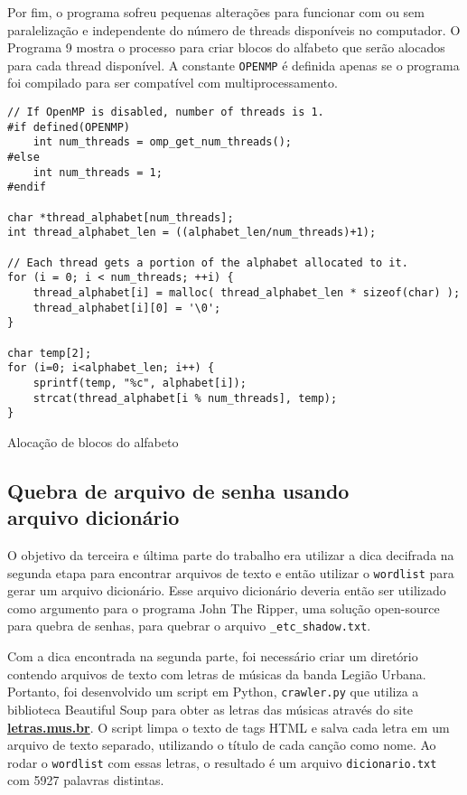 \documentclass{sig-alternate-05-2015}
\begin{document}
Por fim, o programa sofreu pequenas alterações para funcionar com ou sem paralelização e independente do número de threads disponíveis no computador.
O Programa 9 mostra o processo para criar blocos do alfabeto que serão alocados para cada thread disponível.
A constante \texttt{OPENMP} é definida apenas se o programa foi compilado para ser compatível com multiprocessamento.

\begin{program}
\begin{lstlisting}
// If OpenMP is disabled, number of threads is 1.
#if defined(OPENMP)
    int num_threads = omp_get_num_threads();
#else
    int num_threads = 1;
#endif

char *thread_alphabet[num_threads];
int thread_alphabet_len = ((alphabet_len/num_threads)+1);

// Each thread gets a portion of the alphabet allocated to it. 
for (i = 0; i < num_threads; ++i) {
    thread_alphabet[i] = malloc( thread_alphabet_len * sizeof(char) );
    thread_alphabet[i][0] = '\0';
}

char temp[2];
for (i=0; i<alphabet_len; i++) {
    sprintf(temp, "%c", alphabet[i]);
    strcat(thread_alphabet[i % num_threads], temp);
}\end{lstlisting}
\caption{Alocação de blocos do alfabeto}
\end{program}

\subsection{Quebra de arquivo de senha usando\\ arquivo dicionário}

O objetivo da terceira e última parte do trabalho era utilizar a dica decifrada na segunda etapa para encontrar arquivos de texto e então utilizar o \texttt{wordlist} para gerar um arquivo dicionário.
Esse arquivo dicionário deveria então ser utilizado como argumento para o programa John The Ripper, uma solução open-source para quebra de senhas, para quebrar o arquivo \texttt{\_etc\_shadow.txt}.

Com a dica encontrada na segunda parte, foi necessário criar um diretório contendo arquivos de texto com letras de músicas da banda Legião Urbana.
Portanto, foi desenvolvido um script em Python, \texttt{crawler.py} que utiliza a biblioteca Beautiful Soup \cite{beautifulsoup} para obter as letras das músicas através do site \textbf{\url{letras.mus.br}}.
O script limpa o texto de tags HTML e salva cada letra em um arquivo de texto separado, utilizando o título de cada canção como nome.
Ao rodar o \texttt{wordlist} com essas letras, o resultado é um arquivo \texttt{dicionario.txt} com 5927 palavras distintas.
\end{document}
